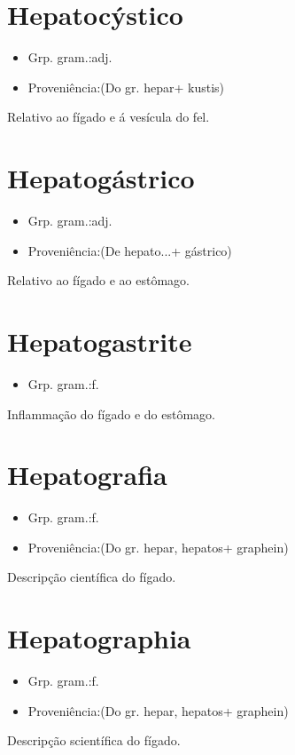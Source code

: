 \documentclass{article}
\begin{document}
\section{Hepatocýstico}
\begin{itemize}
\item {Grp. gram.:adj.}
\end{itemize}
\begin{itemize}
\item {Proveniência:(Do gr. \textunderscore hepar\textunderscore  + \textunderscore kustis\textunderscore )}
\end{itemize}
Relativo ao fígado e á vesícula do fel.
\section{Hepatogástrico}
\begin{itemize}
\item {Grp. gram.:adj.}
\end{itemize}
\begin{itemize}
\item {Proveniência:(De \textunderscore hepato...\textunderscore  + \textunderscore gástrico\textunderscore )}
\end{itemize}
Relativo ao fígado e ao estômago.
\section{Hepatogastrite}
\begin{itemize}
\item {Grp. gram.:f.}
\end{itemize}
Inflammação do fígado e do estômago.
\section{Hepatografia}
\begin{itemize}
\item {Grp. gram.:f.}
\end{itemize}
\begin{itemize}
\item {Proveniência:(Do gr. \textunderscore hepar\textunderscore , \textunderscore hepatos\textunderscore  + \textunderscore graphein\textunderscore )}
\end{itemize}
Descripção científica do fígado.
\section{Hepatographia}
\begin{itemize}
\item {Grp. gram.:f.}
\end{itemize}
\begin{itemize}
\item {Proveniência:(Do gr. \textunderscore hepar\textunderscore , \textunderscore hepatos\textunderscore  + \textunderscore graphein\textunderscore )}
\end{itemize}
Descripção scientífica do fígado.
\end{document}

